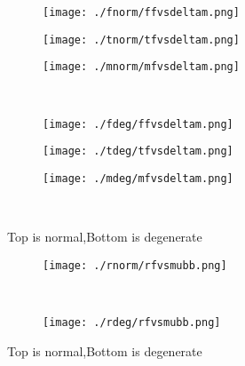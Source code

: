 \documentclass[aps,floats,floatfix,nofootinbib]{revtex4-1}
\begin{document}
\begin{center}
\begin{figure}
\begin{subfigure}{0.3\textwidth}
\texttt{[image: ./fnorm/ffvsdeltam.png]}
\label{}
\end{subfigure}
\begin{subfigure}{0.3\textwidth}
\texttt{[image: ./tnorm/tfvsdeltam.png]}
\label{}
\end{subfigure}
\begin{subfigure}{0.3\textwidth}
\texttt{[image: ./mnorm/mfvsdeltam.png]}
\label{}
\end{subfigure}\\
\begin{subfigure}{0.3\textwidth}
\texttt{[image: ./fdeg/ffvsdeltam.png]}
\label{}
\end{subfigure}
\begin{subfigure}{0.3\textwidth}
\texttt{[image: ./tdeg/tfvsdeltam.png]}
\label{}
\end{subfigure}
\begin{subfigure}{0.3\textwidth}
\texttt{[image: ./mdeg/mfvsdeltam.png]}
\label{}
\end{subfigure}\\
\caption{Top is normal,Bottom is degenerate}
\end{figure}
\end{center}

\begin{center}
\begin{figure}
\begin{subfigure}{0.95\textwidth}
\texttt{[image: ./rnorm/rfvsmubb.png]}
\label{}
\end{subfigure}\\
\begin{subfigure}{0.95\textwidth}
\texttt{[image: ./rdeg/rfvsmubb.png]}
\label{}
\end{subfigure}
\caption{Top is normal,Bottom is degenerate}
\end{figure}
\end{center}
\end{document}
